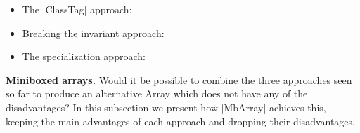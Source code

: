 \vspace{-1em}
\begin{itemize}
  \item The |ClassTag| approach:
  \item Breaking the invariant approach:
  \item The specialization approach:
\end{itemize}
\vspace{-1em}

\textbf{Miniboxed arrays.} Would it be possible to combine the three approaches seen so far to produce an alternative Array which does not have any of the disadvantages? In this subsection we present how |MbArray| achieves this, keeping the main advantages of each approach and dropping their disadvantages.



